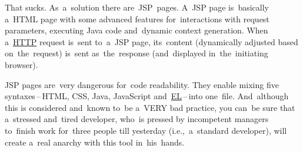 \noindent That sucks.
As~a~solution there are~JSP~pages.
A~JSP page is~basically a~HTML page with some advanced features for~interactions with request parameters, executing Java code and~dynamic context generation.
When a~\hyperref[http]{HTTP} request is~sent to~a~JSP page, its~content (dynamically adjusted based on~the~request) is~sent as~the~response (and~displayed in~the~initiating browser).

\warning JSP pages are~very dangerous for~code readability.
They enable mixing five syntaxes\,--\,HTML, CSS, Java, JavaScript and~\hyperref[el]{EL}\,--\,into one~file.
And~although this is considered and~known to~be a~VERY bad practice, you can~be sure that a~stressed and~tired developer, who~is pressed by incompetent managers to~finish work for~three people till yesterday (i.e.,~a~standard developer), will create a~real anarchy with this tool in~his~hands.

\label{jstl}

\label{jspattributeparameter}


\label{el}
